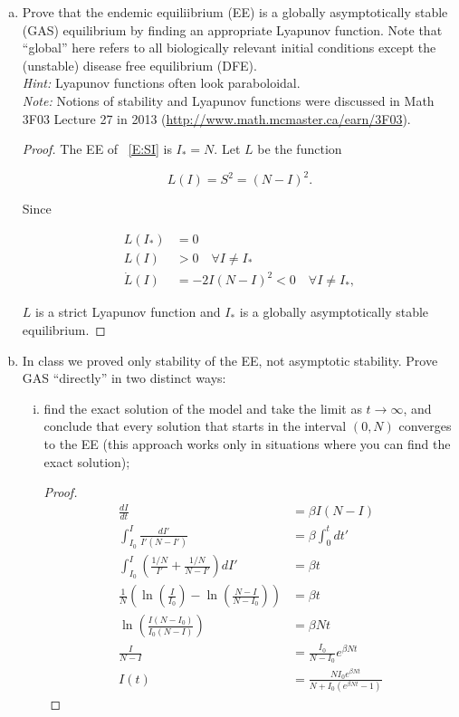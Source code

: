 \documentclass[12pt]{article}
\begin{document}
\begin{enumerate}[(a)]
  \item Prove that the endemic equiliibrium (EE) is a globally asymptotically stable (GAS) equilibrium by finding an appropriate Lyapunov function.  Note that ``global'' here refers to all biologically relevant initial conditions except the (unstable) disease free equilibrium (DFE).  \\
\emph{Hint:} Lyapunov functions often look paraboloidal. \\
\emph{Note:} Notions of stability and Lyapunov functions were discussed in Math 3F03 Lecture 27 in 2013 (\url{http://www.math.mcmaster.ca/earn/3F03}).

{\color{blue}
\begin{proof}
{\color{magenta}

	The EE of ~\eqref{E:SI} is $I_* = N$.
	Let $L$ be the function
	
	\begin{equation}\label{E:L}
 		L(I) = S^2 = (N-I)^2.
	\end{equation}
	
	Since
	
	\begin{align}
		L(I_*) &= 0 \\
		L(I) &> 0 \quad \forall I \neq I_* \\
		\dot{L}(I) &= -2I(N-I)^2 < 0 \quad \forall I \neq I_* ,
	\end{align}
	
	$L$ is a strict Lyapunov function and $I_*$ is a globally asymptotically stable equilibrium.
}
\end{proof}
}

  \item In class we proved only stability of the EE, not asymptotic stability.  Prove GAS ``directly'' in two distinct ways: 
\begin{enumerate}[(i)]
\item find the exact solution of the model and take the limit as $t\to\infty$, and conclude that every solution that starts in the interval $(0,N)$ converges to the EE (this approach works only in situations where you can find the exact solution); 

{\color{blue}
\begin{proof}
{\color{magenta}

	\begin{align}
		\frac{dI}{dt} &= \beta I(N - I) \\
		 \int_{I_0}^{I} \frac{dI'}{I'(N-I')} &= \beta \int_{0}^{t}  dt' \\
		\int_{I_0}^{I} \left ( \frac{1/N}{I'} + \frac{1/N}{N-I'} \right ) dI' &= \beta t \\
		\frac{1}{N} \left ( \ln \left (\frac{I}{I_0} \right ) - \ln \left (\frac{N-I}{N-I_0} \right ) \right ) &= \beta t \\
		\ln \left ( \frac{I(N-I_0)}{I_0(N-I)} \right ) &= \beta Nt \\
		\frac{I}{N-I} &= \frac{I_0}{N-I_0} e^{\beta Nt} \\
		I(t) &= \frac{NI_0e^{\beta Nt}}{N+I_0(e^{\beta Nt} -1)}
	\end{align}

}
\end{proof}}
\end{enumerate}
\end{enumerate}
\end{document}
